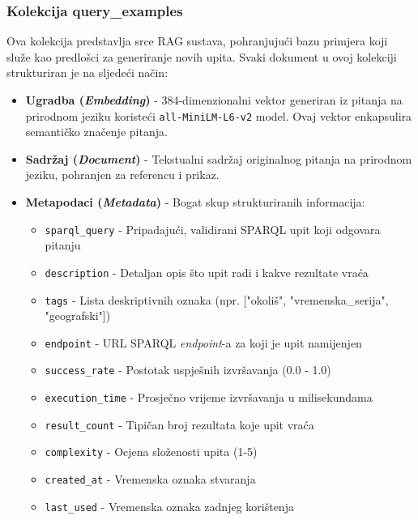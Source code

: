 \subsubsection{Kolekcija query\_examples}

Ova kolekcija predstavlja srce RAG sustava, pohranjujući bazu primjera koji služe kao predlošci za generiranje novih upita. Svaki dokument u ovoj kolekciji strukturiran je na sljedeći način:

\begin{itemize}
    \item \textbf{Ugradba (\textit{Embedding})} - 384-dimenzionalni vektor generiran iz pitanja na prirodnom jeziku koristeći \texttt{all-MiniLM-L6-v2} model. Ovaj vektor enkapsulira semantičko značenje pitanja.
    
    \item \textbf{Sadržaj (\textit{Document})} - Tekstualni sadržaj originalnog pitanja na prirodnom jeziku, pohranjen za referencu i prikaz.
    
    \item \textbf{Metapodaci (\textit{Metadata})} - Bogat skup strukturiranih informacija:
    \begin{itemize}
        \item \texttt{sparql\_query} - Pripadajući, validirani SPARQL upit koji odgovara pitanju
        \item \texttt{description} - Detaljan opis što upit radi i kakve rezultate vraća
        \item \texttt{tags} - Lista deskriptivnih oznaka (npr. ["okoliš", "vremenska\_serija", "geografski"])
        \item \texttt{endpoint} - URL SPARQL \textit{endpoint}-a za koji je upit namijenjen
        \item \texttt{success\_rate} - Postotak uspješnih izvršavanja (0.0 - 1.0)
        \item \texttt{execution\_time} - Prosječno vrijeme izvršavanja u milisekundama
        \item \texttt{result\_count} - Tipičan broj rezultata koje upit vraća
        \item \texttt{complexity} - Ocjena složenosti upita (1-5)
        \item \texttt{created\_at} - Vremenska oznaka stvaranja
        \item \texttt{last\_used} - Vremenska oznaka zadnjeg korištenja
    \end{itemize}
\end{itemize}

